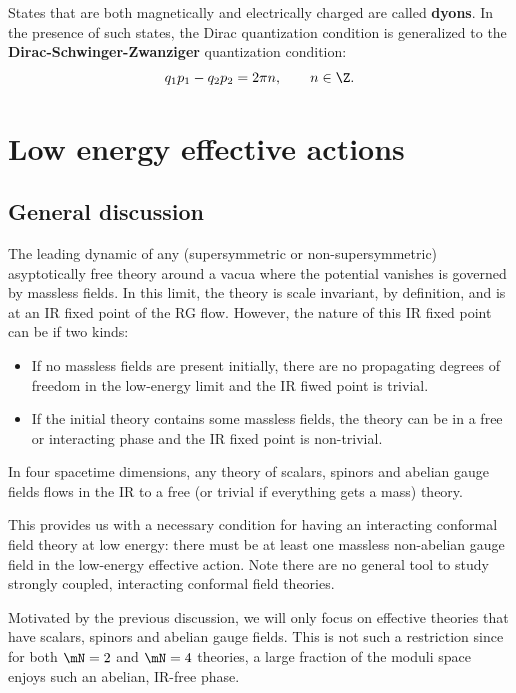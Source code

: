 \documentclass{worksheetclass}
\renewcommand{\emph}{\textbf}
\begin{document}
    States that are both magnetically and electrically charged are called \emph{dyons}. In the presence of such states, the Dirac quantization condition is generalized to the \emph{Dirac-Schwinger-Zwanziger} quantization condition:
    \begin{equation}
        q_1p_1-q_2p_2=2\pi n,\qquad n\in\Z.
    \end{equation}



\section{Low energy effective actions}

    \subsection{General discussion}

        The leading dynamic of any (supersymmetric or non-supersymmetric) asyptotically free theory around a vacua where the potential vanishes is governed by massless fields. In this limit, the theory is scale invariant, by definition, and is at an IR fixed point of the RG flow. However, the nature of this IR fixed point can be if two kinds:
        \begin{itemize}
            \item If no massless fields are present initially, there are no propagating degrees of freedom in the low-energy limit and the IR fiwed point is trivial.
            \item If the initial theory contains some massless fields, the theory can be in a free or interacting phase and the IR fixed point is non-trivial.
        \end{itemize}
        
        \begin{theorem}
            In four spacetime dimensions, any theory of scalars, spinors and abelian gauge fields flows in the IR to a free (or trivial if everything gets a mass) theory.
        \end{theorem}
        This provides us with a necessary condition for having an interacting conformal field theory at low energy: there must be at least one massless non-abelian gauge field in the low-energy effective action. Note there are no general tool to study strongly coupled, interacting conformal field theories.

        Motivated by the previous discussion, we will only focus on effective theories that have scalars, spinors and abelian gauge fields. This is not such a restriction since for both $\mN=2$ and $\mN=4$ theories, a large fraction of the moduli space enjoys such an abelian, IR-free phase.
        
\end{document}
